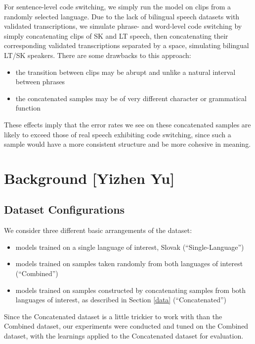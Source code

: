 \documentclass{article}
\begin{document}
  For sentence-level code switching, we simply run the model on clips from a randomly selected language. Due to the lack of bilingual speech datasets with validated transcriptions, we simulate phrase- and word-level code switching by simply concatenating clips of SK and LT speech, then concatenating their corresponding validated transcriptions separated by a space, simulating bilingual LT/SK speakers. There are some drawbacks to this approach:
  \begin{itemize}
    \item the transition between clips may be abrupt and unlike a natural interval between phrases
    \item the concatenated samples may be of very different character or grammatical function
  \end{itemize}
  These effects imply that the error rates we see on these concatenated samples are likely to exceed those of real speech exhibiting code switching, since such a sample would have a more consistent structure and be more cohesive in meaning.
  \section{Background [Yizhen Yu]}
  \subsection{Dataset Configurations}
  We consider three different basic arrangements of the dataset:
  \begin{itemize}
    \item models trained on a single language of interest, Slovak (``Single-Language'')
    \item models trained on samples taken randomly from both languages of interest (``Combined'')
    \item models trained on samples constructed by concatenating samples from both languages of interest, as described in Section \ref{data} (``Concatenated'')
  \end{itemize}
  Since the Concatenated dataset is a little trickier to work with than the Combined dataset, our experiments were conducted and tuned on the Combined dataset, with the learnings applied to the Concatenated dataset for evaluation.
\end{document}
